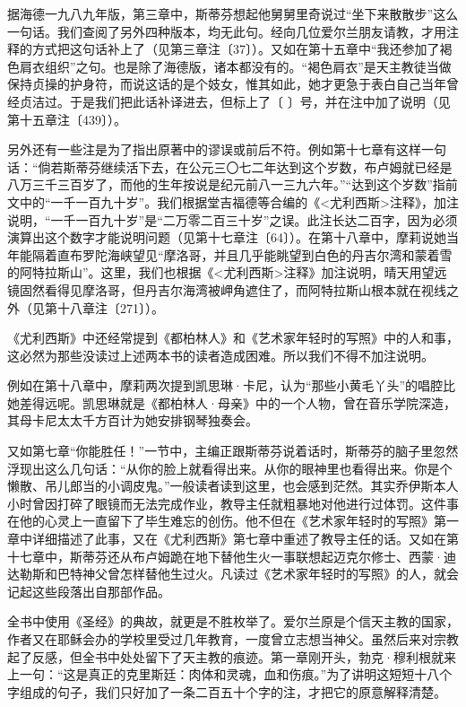 \par 据海德一九八九年版，第三章中，斯蒂芬想起他舅舅里奇说过“坐下来散散步”这么一句话。我们查阅了另外四种版本，均无此句。经向几位爱尔兰朋友请教，才用注释的方式把这句话补上了（见第三章注〔37〕）。又如在第十五章中“我还参加了褐色肩衣组织”之句。也是除了海德版，诸本都没有的。“褐色肩衣”是天主教徒当做保持贞操的护身符，而说这话的是个妓女，惟其如此，她才更急于表白自己当年曾经贞洁过。于是我们把此话补译进去，但标上了〔 〕号，并在注中加了说明（见第十五章注〔439〕）。
\par 另外还有一些注是为了指出原著中的谬误或前后不符。例如第十七章有这样一句话：“倘若斯蒂芬继续活下去，在公元三〇七二年达到这个岁数，布卢姆就已经是八万三千三百岁了，而他的生年按说是纪元前八一三九六年。”“达到这个岁数”指前文中的“一千一百九十岁”。我们根据堂吉福德等合编的《<尤利西斯>注释》，加注说明，“一千一百九十岁”是“二万零二百三十岁”之误。此注长达二百字，因为必须演算出这个数字才能说明问题（见第十七章注〔64〕）。在第十八章中，摩莉说她当年能隔着直布罗陀海峡望见“摩洛哥，并且几乎能眺望到白色的丹吉尔湾和蒙着雪的阿特拉斯山”。这里，我们也根据《<尤利西斯>注释》加注说明，晴天用望远镜固然看得见摩洛哥，但丹吉尔海湾被岬角遮住了，而阿特拉斯山根本就在视线之外（见第十八章注〔271〕）。
\par 《尤利西斯》中还经常提到《都柏林人》和《艺术家年轻时的写照》中的人和事，这必然为那些没读过上述两本书的读者造成困难。所以我们不得不加注说明。
\par 例如在第十八章中，摩莉两次提到凯思琳·卡尼，认为“那些小黄毛丫头”的唱腔比她差得远呢。凯思琳就是《都柏林人·母亲》中的一个人物，曾在音乐学院深造，其母卡尼太太千方百计为她安排钢琴独奏会。
\par 又如第七章“你能胜任！”一节中，主编正跟斯蒂芬说着话时，斯蒂芬的脑子里忽然浮现出这么几句话：“从你的脸上就看得出来。从你的眼神里也看得出来。你是个懒散、吊儿郎当的小调皮鬼。”一般读者读到这里，也会感到茫然。其实乔伊斯本人小时曾因打碎了眼镜而无法完成作业，教导主任就粗暴地对他进行过体罚。这件事在他的心灵上一直留下了毕生难忘的创伤。他不但在《艺术家年轻时的写照》第一章中详细描述了此事，又在《尤利西斯》第七章中重述了教导主任的话。又如在第十七章中，斯蒂芬还从布卢姆跪在地下替他生火一事联想起迈克尔修士、西蒙·迪达勒斯和巴特神父曾怎样替他生过火。凡读过《艺术家年轻时的写照》的人，就会记起这些段落出自那部作品。
\par 全书中使用《圣经》的典故，就更是不胜枚举了。爱尔兰原是个信天主教的国家，作者又在耶稣会办的学校里受过几年教育，一度曾立志想当神父。虽然后来对宗教起了反感，但全书中处处留下了天主教的痕迹。第一章刚开头，勃克·穆利根就来上一句：“这是真正的克里斯廷：肉体和灵魂，血和伤痕。”为了讲明这短短十八个字组成的句子，我们只好加了一条二百五十个字的注，才把它的原意解释清楚。
